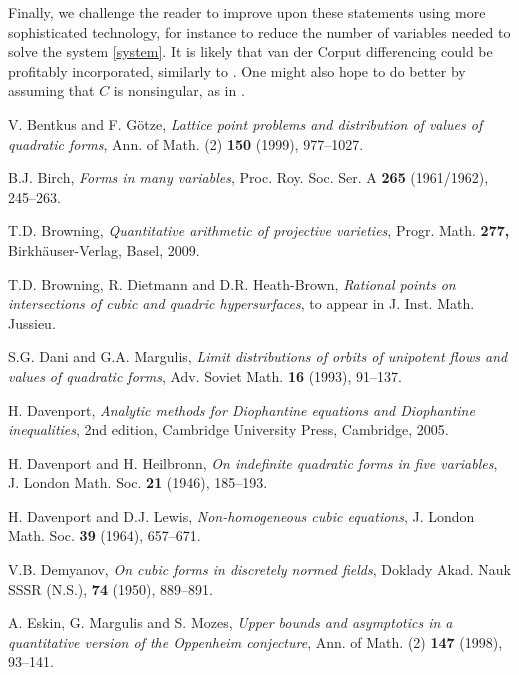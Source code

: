 \documentclass[12pt,reqno]{amsart}
\theoremstyle{definition}
\theoremstyle{remark}
\numberwithin{equation}{section}
\begin{document}
Finally, we challenge the reader to improve upon these statements using more sophisticated technology, for instance to reduce the number of variables needed to solve the system \eqref{system}. It is likely that van der Corput differencing could be profitably incorporated, similarly to \cite{HB2007}. One might also hope to do better by assuming that $C$ is nonsingular, as in \cite{HB1983}.


\providecommand{\bysame}{\leavevmode\hbox to3em{\hrulefill}\thinspace}
\begin{thebibliography}{50}

V. Bentkus and F. G\"otze, \emph{Lattice point problems and distribution of values of quadratic forms},
Ann. of Math. (2) \textbf{150} (1999), 977--1027.

B.J. Birch, \emph{Forms in many variables}, Proc. Roy. Soc. Ser. A \textbf{265} (1961/1962), 245--263. 

T.D. Browning, \emph{Quantitative arithmetic of projective varieties}, Progr. Math. \textbf{277,} Birkh\"auser-Verlag, Basel, 2009.

T.D. Browning, R. Dietmann and D.R. Heath-Brown,
\emph{Rational points on intersections of cubic and quadric hypersurfaces},
to appear in J. Inst. Math. Jussieu.

 S.G. Dani and G.A. Margulis, \emph{Limit distributions of orbits of unipotent flows and values of quadratic forms}, Adv. Soviet Math. \textbf{16} (1993), 91--137.

H. Davenport, \emph{Analytic methods for Diophantine equations and Diophantine inequalities}, 2nd edition, Cambridge University Press, Cambridge, 2005.

H. Davenport and H. Heilbronn, \emph{On indefinite quadratic forms in five variables}, J. London Math. Soc. \textbf{21} (1946), 185--193. 

H. Davenport and D.J. Lewis, \emph{Non-homogeneous cubic equations}, J. London Math. Soc. \textbf{39} (1964), 657--671. 

V.B. Demyanov, \emph{On cubic forms in discretely normed fields}, Doklady Akad.
Nauk SSSR (N.S.), \textbf{74} (1950), 889--891.

A. Eskin, G. Margulis and S. Mozes, \emph{Upper bounds and asymptotics in a quantitative version of the Oppenheim conjecture}, Ann. of Math. (2) \textbf{147} (1998), 93--141. 


\end{thebibliography}
\end{document}
